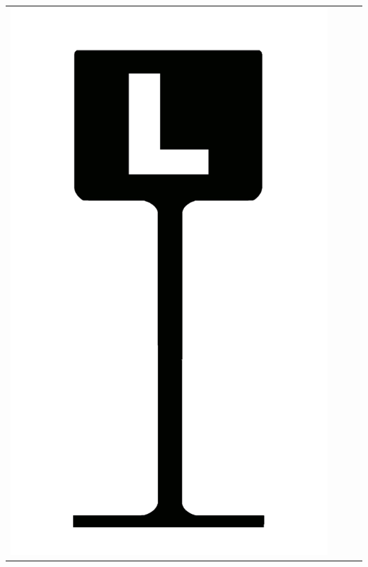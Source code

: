 {\begin{center}
\begin{tabular}{ c c c c}
\includegraphics[scale=0.021, trim= 0em -5em -5em -5em,]{Icones/icon_loire_black.pdf}
&

\end{tabular}
\end{center}}
